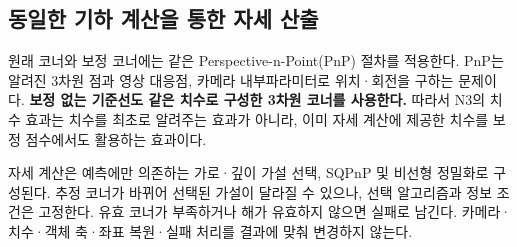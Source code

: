 \subsection{동일한 기하 계산을 통한 자세 산출}
원래 코너와 보정 코너에는 같은 Perspective-n-Point(PnP) 절차를 적용한다. PnP는 알려진 3차원 점과 영상 대응점, 카메라 내부파라미터로 위치·회전을 구하는 문제이다. \textbf{보정 없는 기준선도 같은 치수로 구성한 3차원 코너를 사용한다.} 따라서 N3의 치수 효과는 치수를 최초로 알려주는 효과가 아니라, 이미 자세 계산에 제공한 치수를 보정 점수에서도 활용하는 효과이다.

자세 계산은 예측에만 의존하는 가로·깊이 가설 선택, SQPnP\cite{sqpnp2020} 및 비선형 정밀화로 구성된다. 추정 코너가 바뀌어 선택된 가설이 달라질 수 있으나, 선택 알고리즘과 정보 조건은 고정한다. 유효 코너가 부족하거나 해가 유효하지 않으면 실패로 남긴다. 카메라·치수·객체 축·좌표 복원·실패 처리를 결과에 맞춰 변경하지 않는다.
